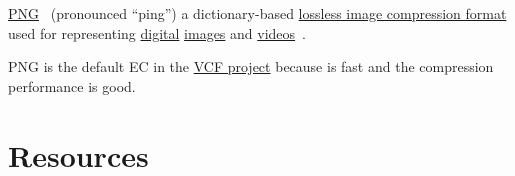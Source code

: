 \href{https://en.wikipedia.org/wiki/Portable_Network_Graphics}{PNG}~\cite{vruiz__PNG}
(pronounced ``ping'') a dictionary-based
\href{https://en.wikipedia.org/wiki/Lossless_compression}{lossless
  image compression format} used for representing
\href{https://en.wikipedia.org/wiki/Digital_data}{digital}
\href{https://en.wikipedia.org/wiki/Digital_image}{images} and
\href{https://en.wikipedia.org/wiki/Video}{videos}~\cite{vruiz__image_video}.

PNG is the default EC in the
\href{https://github.com/Sistemas-Multimedia/VCF}{VCF project} because
is fast and the compression performance is good.

\section{}

\section{Resources}

\renewcommand{\addcontentsline}[3]{}%

